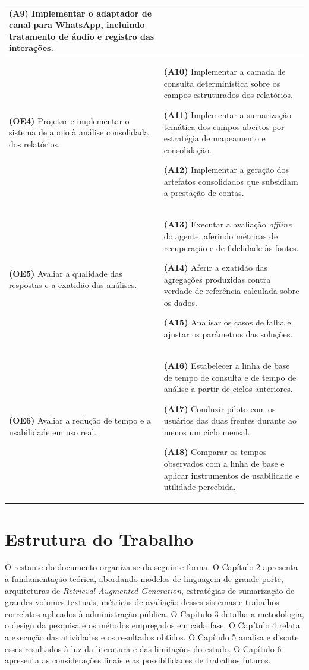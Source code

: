 {\begin{longtable}{|p{}|p{}|}
\smallskip
\textbf{(A9)} Implementar o adaptador de canal para WhatsApp, incluindo
tratamento de áudio e registro das interações. \\
\hline

\textbf{(OE4)} Projetar e implementar o sistema de apoio à análise consolidada
dos relatórios.
& \textbf{(A10)} Implementar a camada de consulta determinística sobre os campos
estruturados dos relatórios.

\smallskip
\textbf{(A11)} Implementar a sumarização temática dos campos abertos por
estratégia de mapeamento e consolidação.

\smallskip
\textbf{(A12)} Implementar a geração dos artefatos consolidados que subsidiam a
prestação de contas. \\
\hline

\textbf{(OE5)} Avaliar a qualidade das respostas e a exatidão das análises.
& \textbf{(A13)} Executar a avaliação \textit{offline} do agente, aferindo
métricas de recuperação e de fidelidade às fontes.

\smallskip
\textbf{(A14)} Aferir a exatidão das agregações produzidas contra verdade de
referência calculada sobre os dados.

\smallskip
\textbf{(A15)} Analisar os casos de falha e ajustar os parâmetros das soluções.
\\
\hline

\textbf{(OE6)} Avaliar a redução de tempo e a usabilidade em uso real.
& \textbf{(A16)} Estabelecer a linha de base de tempo de consulta e de tempo de
análise a partir de ciclos anteriores.

\smallskip
\textbf{(A17)} Conduzir piloto com os usuários das duas frentes durante ao menos
um ciclo mensal.

\smallskip
\textbf{(A18)} Comparar os tempos observados com a linha de base e aplicar
instrumentos de usabilidade e utilidade percebida. \\
\end{longtable}
}

\section{Estrutura do Trabalho}
\label{sec:introducao-estrutura}

O restante do documento organiza-se da seguinte forma. O Capítulo 2 apresenta a
fundamentação teórica, abordando modelos de linguagem de grande porte,
arquiteturas de \textit{Retrieval-Augmented Generation}, estratégias de
sumarização de grandes volumes textuais, métricas de avaliação desses sistemas e
trabalhos correlatos aplicados à administração pública. O Capítulo 3 detalha a
metodologia, o design da pesquisa e os métodos empregados em cada fase. O
Capítulo 4 relata a execução das atividades e os resultados obtidos. O Capítulo
5 analisa e discute esses resultados à luz da literatura e das limitações do
estudo. O Capítulo 6 apresenta as considerações finais e as possibilidades de
trabalhos futuros.
